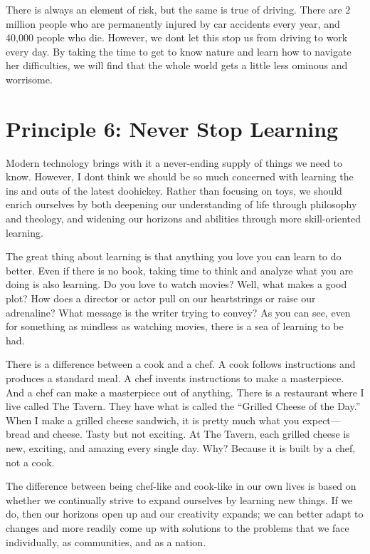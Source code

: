 \documentclass[letterpaper]{article}
\begin{document}
{\color{black}
There is always an element of risk, but the same is true of driving.
There are 2 million people who are permanently injured by car accidents
every year, and 40,000 people who die. However, we
don{\textquotesingle}t let this stop us from driving to work every day.
By taking the time to get to know nature and learn how to navigate her
difficulties, we will find that the whole world gets a little less
ominous and worrisome. }

\section[Principle 6: Never Stop Learning]{Principle 6: Never Stop
Learning}
{\color{black}
Modern technology brings with it a never-ending supply of things we need
to know. However, I don{\textquotesingle}t think we should be so much
concerned with learning the ins and outs of the latest doohickey.
Rather than focusing on toys, we should enrich ourselves by both
deepening our understanding of life through philosophy and theology,
and widening our horizons and abilities through more skill-oriented
learning.}

{\color{black}
The great thing about learning is that anything you love you can learn
to do better. Even if there is no book, taking time to think and
analyze what you are doing is also learning. Do you love to watch
movies? Well, what makes a good plot?  How does a director or actor
pull on our heartstrings or raise our adrenaline?  What message is the
writer trying to convey?  As you can see, even for something as
mindless as watching movies, there is a sea of learning to be had.}

{\color{black}
There is a difference between a cook and a chef. A cook follows
instructions and produces a standard meal. A chef invents instructions
to make a masterpiece. And a chef can make a masterpiece out of
anything. There is a restaurant where I live called The Tavern. They
have what is called the “Grilled Cheese of the Day.”  When I make a
grilled cheese sandwich, it is pretty much what you expect—bread and
cheese. Tasty but not exciting. At The Tavern, each grilled cheese is
new, exciting, and amazing every single day. Why?  Because it is built
by a chef, not a cook. }

{\color{black}
The difference between being chef-like and cook-like in our own lives is
based on whether we continually strive to expand ourselves by learning
new things. If we do, then our horizons open up and our creativity
expands; we can better adapt to changes and
\textcolor[rgb]{0.32941177,0.5529412,0.83137256}{more readily} come up
with solutions to the problems that we face individually, as
communities, and as a nation.}
\end{document}
